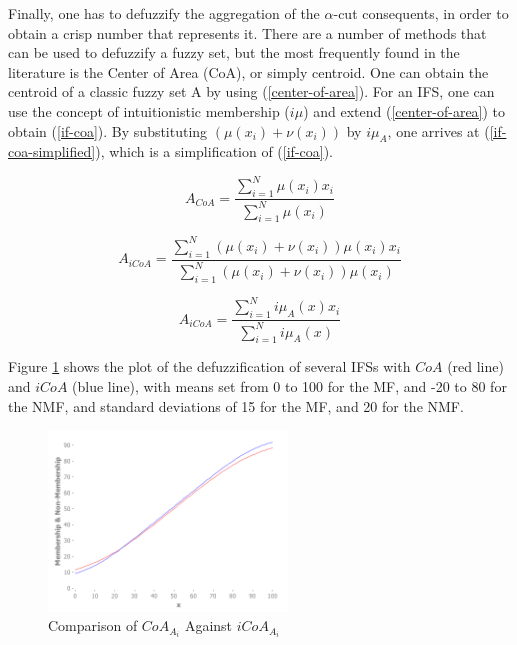 \documentclass[conference]{IEEEtran}
\begin{document}
Finally, one has to defuzzify the aggregation of the $\alpha$-cut 
consequents, in order to obtain a crisp number that represents
it. There are a number of methods that can be used to defuzzify a
fuzzy set, but the most frequently found in the literature is the
Center of Area (CoA), or simply centroid. One can obtain the centroid
of a classic fuzzy set A by using (\ref{center-of-area}). For an
IFS, one can use the concept of intuitionistic membership ($i\mu$) and
extend (\ref{center-of-area}) to obtain (\ref{if-coa}). By
substituting $(\mu(x_{i}) + \nu(x_{i}))$ by $i\mu_{A}$, one arrives at
(\ref{if-coa-simplified}), which is a simplification of (\ref{if-coa}).

\begin{equation}
  \label{center-of-area}
  A_{CoA} = \dfrac{\sum_{i=1}^{N} \mu(x_{i})
    x_{i}}{\sum_{i=1}^{N} \mu(x_{i})}
\end{equation}

\begin{equation}
  \label{if-coa}
  A_{iCoA} = \dfrac{\sum_{i=1}^{N} (\mu(x_{i}) + \nu(x_{i})) \mu(x_{i})
    x_{i}}{\sum_{i=1}^{N} (\mu(x_{i}) + \nu(x_{i})) \mu(x_{i})}
\end{equation}

\begin{equation}
  \label{if-coa-simplified}
  A_{iCoA} = \dfrac{\sum_{i=1}^{N} i\mu_{A}(x) x_{i}}{\sum_{i=1}^{N}
    i\mu_{A}(x)}
\end{equation}

Figure \ref{if-coa-vs-coa} shows the plot of the defuzzification of
several IFSs with $CoA$ (red line) and $iCoA$ (blue line), with means set
from 0 to 100 for the MF, and -20 to 80 for the NMF, and standard
deviations of 15 for the MF, and 20 for the NMF.

\begin{figure}[!t]
  \centering
  \includegraphics[width=2.5in]{if-coa-vs-coa}
  \caption{Comparison of $CoA_{A_{i}}$ Against $iCoA_{A_{i}}$}
  \label{if-coa-vs-coa}
\end{figure}
\end{document}

